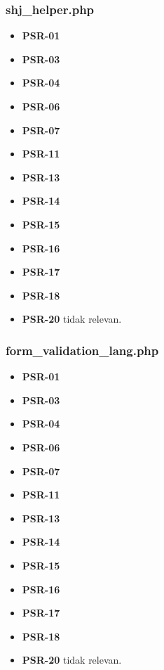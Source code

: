 \subsubsection{shj\_helper.php}
\begin{itemize}
	\item \textbf{PSR-01} 
	\item \textbf{PSR-03}
	\item \textbf{PSR-04}
	\item \textbf{PSR-06}
	\item \textbf{PSR-07}
	\item \textbf{PSR-11}
	\item \textbf{PSR-13}
	\item \textbf{PSR-14}
	\item \textbf{PSR-15}
	\item \textbf{PSR-16}
	\item \textbf{PSR-17} 
	\item \textbf{PSR-18} 
	\item \textbf{PSR-20} tidak relevan.
\end{itemize}

\subsubsection{form\_validation\_lang.php}
\begin{itemize}
	\item \textbf{PSR-01} 
	\item \textbf{PSR-03}
	\item \textbf{PSR-04}
	\item \textbf{PSR-06}
	\item \textbf{PSR-07}
	\item \textbf{PSR-11}
	\item \textbf{PSR-13}
	\item \textbf{PSR-14}
	\item \textbf{PSR-15}
	\item \textbf{PSR-16}
	\item \textbf{PSR-17} 
	\item \textbf{PSR-18} 
	\item \textbf{PSR-20} tidak relevan.
\end{itemize}

